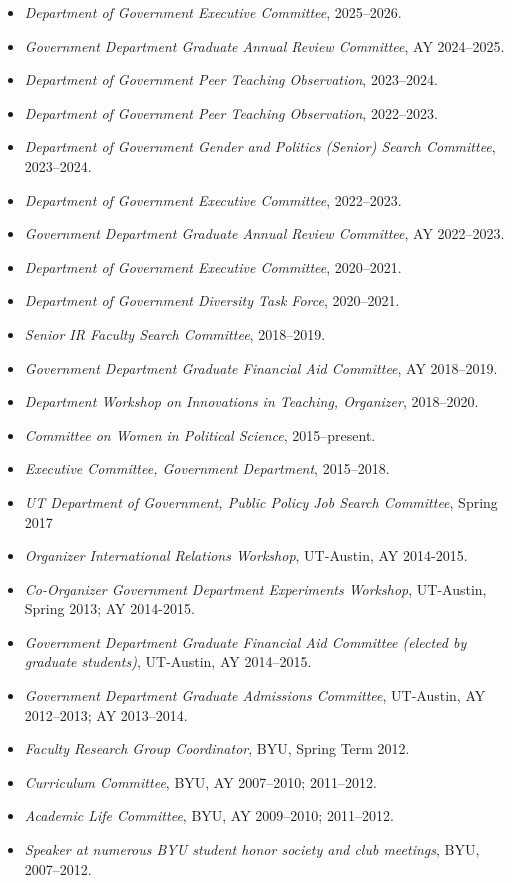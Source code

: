 \documentclass[10pt]{article}
\begin{document}
\begin{itemize}\setlength{\itemsep}{1pt}
\item \textit{Department of Government Executive Committee}, 2025--2026.
\item \textit{Government Department Graduate Annual Review Committee}, AY 2024--2025. 
\item \textit{Department of Government Peer Teaching Observation}, 2023--2024. %
\item \textit{Department of Government Peer Teaching Observation}, 2022--2023.
\item \textit{Department of Government Gender and Politics (Senior) Search Committee}, 2023--2024.
\item \textit{Department of Government Executive Committee}, 2022--2023.
\item \textit{Government Department Graduate Annual Review Committee}, AY 2022--2023. 
\item \textit{Department of Government Executive Committee}, 2020--2021.
\item \textit{Department of Government Diversity Task Force}, 2020--2021.
\item \textit{Senior IR Faculty Search Committee}, 2018--2019.
\item \textit{Government Department Graduate Financial Aid Committee}, AY 2018--2019. 
\item \textit{Department Workshop on Innovations in Teaching, Organizer}, 2018--2020.
\item \textit{Committee on Women in Political Science}, 2015--present.
\item \textit{Executive Committee, Government Department}, 2015--2018.
\item \textit{UT Department of Government, Public Policy Job Search Committee}, Spring 2017
\item \textit{Organizer International Relations Workshop}, UT-Austin, AY 2014-2015.
\item \textit{Co-Organizer Government Department Experiments Workshop}, UT-Austin, Spring 2013; AY 2014-2015.
\item \textit{Government Department Graduate Financial Aid Committee (elected by graduate students)}, UT-Austin, AY 2014--2015. 
\item \textit{Government Department Graduate Admissions Committee}, UT-Austin, AY 2012--2013; AY 2013--2014.
\item \textit{Faculty Research Group Coordinator}, BYU, Spring Term 2012.
\item \textit{Curriculum Committee}, BYU, AY 2007--2010; 2011--2012.
\item \textit{Academic Life Committee}, BYU, AY 2009--2010; 2011--2012.
\item \textit{Speaker at numerous BYU student honor society and club meetings}, BYU, 2007--2012.

\end{itemize}
\end{document}
